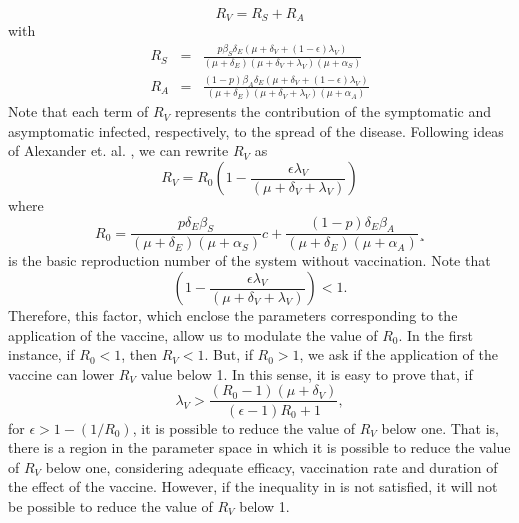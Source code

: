 \begin{equation}
    \label{Rv}
    R_{V} = R_S + R_A
\end{equation}
with
\begin{eqnarray*}
    R_S &=&
    \frac{p\beta_S\delta_E(\mu+\delta_V+(1-\epsilon)
        \lambda_V)}{(\mu+\delta_E)(\mu+\delta_V+\lambda_V)(\mu+\alpha_S)}
    \\
    R_A &=& \frac{(1-p) \beta_A \delta_E (\mu + \delta_V +
    (1-\epsilon)
        \lambda_V)}{(\mu+\delta_E)(\mu + \delta_V + \lambda_V)(\mu
        + \alpha_A )}
\end{eqnarray*}
    Note that each term of $ R_ {V} $ represents the contribution
    of the
symptomatic and asymptomatic infected, respectively, to the spread
of the
disease. Following ideas of Alexander et. al. \cite{Alexander2004},
we can
rewrite $R_V$ as
%
\begin{equation}
    \label{Rv2}
    R_{V} = R_0
        \left(
            1- \frac{\epsilon \lambda_V}{
                (\mu+\delta_V+\lambda_V)
            }
        \right)
\end{equation}
where
\begin{equation}\label{R0}
    R_0 =
        \frac{p\delta_E\beta_S}{(\mu+\delta_E)(\mu+\alpha_S)}c +
        \frac{
            (1-p) \delta_E \beta_A
        }{(\mu+\delta_E)(\mu + \alpha_A)}
¸\end{equation}
is the basic reproduction number of the system without vaccination.
Note that
$$
    \left(1- \frac{\epsilon
    \lambda_V}{(\mu+\delta_V+\lambda_V)}\right)<1.
$$
Therefore, this factor, which enclose the
parameters corresponding to the application of the vaccine,
allow us to modulate the value of $ R_0 $. In the
first instance, if $ R_0 <1 $, then $ R_V <1 $. But, if $ R_0> 1 $,
we ask if the application of the vaccine can lower $R_V$ value
below 1. In this sense, it is easy to prove that, if
\begin{equation}\label{condition1}
    \lambda_V>\frac{(R_0-1)(\mu+\delta_V)}{(\epsilon-1)R_0+1},
\end{equation}
for $\epsilon>1-(1/R_0)$, it is possible to reduce the
value of $ R_V $ below one. That is, there is a region in the
parameter space in which it is possible to reduce the value of
$ R_V $ below one, considering adequate efficacy, vaccination rate
and duration of the effect of the
vaccine. However, if the inequality in  is not
satisfied, it will not be possible to reduce the value of $ R_V $
below 1.

